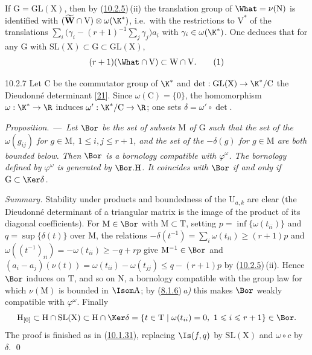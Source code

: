 \documentclass[12pt,a4paper,oneside,english]{smfart}
\makeatletter
\newcommand{\btanchor}[1]{\leavevmode\Hy@raisedlink{\hypertarget{bt:#1}{}}}
\newcommand{\btref}[1]{\hyperlink{bt:#1}{#1}}
\newcommand{\btbib}[1]{\hyperlink{bib:#1}{#1}}
\newcommand{\btunnum}[1]{\par\medskip\noindent\emph{#1}.\ ---\ \ignorespaces}
\theoremstyle{definition}
\theoremstyle{bt}
\makeatother
\begin{document}
If $\mathrm{G}=\mathrm{GL}(\mathrm{X})$, then by (\btref{10.2.5})\,(ii) the translation
group of $\What=\nu(\mathrm{N})$ is identified with
$(\widetilde{\mathbf{W}}\cap\mathrm{V})\otimes\omega(\K^{*})$, i.e.\ with the
restrictions to $\mathrm{V}^{*}$ of the translations
$\sum_i\bigl(\gamma_i-(r+1)^{-1}\sum_j\gamma_j\bigr)a_i$ with
$\gamma_i\in\omega(\K^{*})$. One deduces that for any $\mathrm{G}$ with
$\mathrm{SL}(\mathrm{X})\subset\mathrm{G}\subset\mathrm{GL}(\mathrm{X})$,
\begin{equation*}
(r+1)(\What\cap\mathrm{V})\subset \mathrm{W}\cap\mathrm{V}.
\tag{1}
\end{equation*}

\num{10.2.7}\btanchor{10.2.7} Let $\mathrm{C}$ be the commutator group of $\K^{*}$ and
$\det:\mathrm{GL}(\mathrm{X})\to\K^{*}/\mathrm{C}$ the Dieudonné determinant
[\btbib{21}]. Since $\omega(\mathrm{C})=\{0\}$, the homomorphism $\omega:\K^{*}\to\R$
induces $\omega':\K^{*}/\mathrm{C}\to\R$; one sets $\delta=\omega'\circ\det$.

\btunnum{Proposition}\emph{Let $\Bor$ be the set of subsets
$\mathrm{M}$ of $\mathrm{G}$ such that the set of the $\omega(g_{ij})$ for
$g\in\mathrm{M}$, $1\leqslant i,j\leqslant r+1$, and the set of the $-\delta(g)$
for $g\in\mathrm{M}$ are both bounded below. Then $\Bor$ is a bornology
compatible with $\varphi^{\omega}$. The bornology defined by $\varphi^{\omega}$
is generated by $\Bor.\mathrm{H}$. It coincides with $\Bor$ if and only if
$\mathrm{G}\subset\Ker\delta$.}

\pf
\emph{Summary.} Stability under products and boundedness of the
$\mathrm{U}_{a,k}$ are clear (the Dieudonné determinant of a triangular matrix
is the image of the product of its diagonal coefficients). For
$\mathrm{M}\in\Bor$ with $\mathrm{M}\subset\mathrm{T}$, setting
$p=\inf\{\omega(t_{ii})\}$ and $q=\sup\{\delta(t)\}$ over $\mathrm{M}$, the
relations $-\delta(t^{-1})=\sum_i\omega(t_{ii})\geqslant(r+1)p$ and
$\omega((t^{-1})_{ii})=-\omega(t_{ii})\geqslant -q+rp$ give
$\mathrm{M}^{-1}\in\Bor$ and
$(a_i-a_j)(\nu(t))=\omega(t_{ii})-\omega(t_{jj})\leqslant q-(r+1)p$ by
(\btref{10.2.5})\,(ii). Hence $\Bor$ induces on $\mathrm{T}$, and so on $\mathrm{N}$, a
bornology compatible with the group law for which $\nu(\mathrm{M})$ is bounded
in $\Isom\mathrm{A}$; by (\btref{8.1.6})\,\emph{a)} this makes $\Bor$ weakly compatible
with $\varphi^{\omega}$. Finally
\[
\mathrm{H}_{[0]}\subset\mathrm{H}\cap\mathrm{SL}(\mathrm{X})\subset
\mathrm{H}\cap\Ker\delta=\{t\in\mathrm{T}\mid \omega(t_{ii})=0,\ 1\leqslant i\leqslant r+1\}\in\Bor .
\]
The proof is finished as in (\btref{10.1.31}), replacing $\Is(f,q)$ by
$\mathrm{SL}(\mathrm{X})$ and $\omega\circ c$ by $\delta$. \qed
\end{document}
